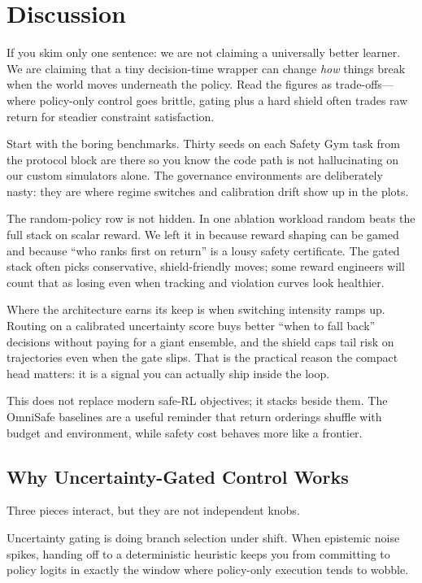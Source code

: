 \section{Discussion}

If you skim only one sentence: we are not claiming a universally better learner. We are claiming that a tiny decision-time wrapper can change \emph{how} things break when the world moves underneath the policy. Read the figures as trade-offs---where policy-only control goes brittle, gating plus a hard shield often trades raw return for steadier constraint satisfaction.

Start with the boring benchmarks. Thirty seeds on each Safety Gym task from the protocol block are there so you know the code path is not hallucinating on our custom simulators alone. The governance environments are deliberately nasty: they are where regime switches and calibration drift show up in the plots.

The random-policy row is not hidden. In one ablation workload random beats the full stack on scalar reward. We left it in because reward shaping can be gamed and because ``who ranks first on return'' is a lousy safety certificate. The gated stack often picks conservative, shield-friendly moves; some reward engineers will count that as losing even when tracking and violation curves look healthier.

Where the architecture earns its keep is when switching intensity ramps up. Routing on a calibrated uncertainty score buys better ``when to fall back'' decisions without paying for a giant ensemble, and the shield caps tail risk on trajectories even when the gate slips. That is the practical reason the compact head matters: it is a signal you can actually ship inside the loop.

This does not replace modern safe-RL objectives; it stacks beside them. The OmniSafe baselines are a useful reminder that return orderings shuffle with budget and environment, while safety cost behaves more like a frontier.

\subsection{Why Uncertainty-Gated Control Works}

Three pieces interact, but they are not independent knobs.

Uncertainty gating is doing branch selection under shift. When epistemic noise spikes, handing off to a deterministic heuristic keeps you from committing to policy logits in exactly the window where policy-only execution tends to wobble.

